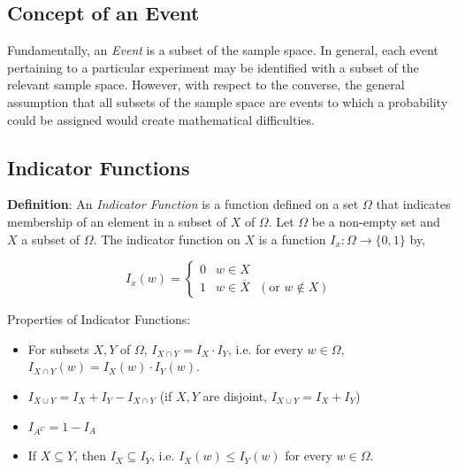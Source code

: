 \documentclass[12pt]{article}
\begin{document}
\subsection*{Concept of an Event}
\noindent
Fundamentally, an \textit{Event} is a subset of the sample space. In general, each event pertaining to a particular experiment may be identified with a subset of the relevant sample space. However, with respect to the converse, the general assumption that all subsets of the sample space are events to which a probability could be assigned would create mathematical difficulties.

\subsection*{Indicator Functions}
\noindent
\textbf{Definition}: An \textit{Indicator Function} is a function defined on a set $\Omega$ that indicates membership of an element in a subset of $X$ of $\Omega$. Let $\Omega$ be a non-empty set and $X$ a subset of $\Omega$. The indicator function on $X$ is a function $I_x : \Omega \rightarrow \{ 0,1 \}$ by,

\begin{equation*}
I_x(w) =  \begin{cases} 
      0 & w \in X \\
      1 & w \in \overline{X} \text{  } (\text{or } w \not \in X)
   \end{cases}
\end{equation*}

\noindent
Properties of Indicator Functions:

\begin{itemize}
\item For subsets $X, Y$ of $\Omega$, $I_{X \cap Y}=I_X \cdot I_Y$, i.e. for every $w \in \Omega$, $I_{X \cap Y}(w)=I_X(w) \cdot I_Y(w)$.
\item $I_{X \cup Y}=I_X + I_Y - I_{X \cap Y}$ (if $X,Y$ are disjoint, $I_{X \cup Y}=I_X + I_Y$)
\item $I_{A^C}=1-I_A$
\item If $X \subseteq Y$, then $I_X \subseteq I_Y$, i.e. $I_X(w) \leq I_Y(w)$ for every $w \in \Omega$.
\end{itemize}

\end{document}
